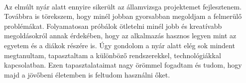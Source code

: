	\paragraph{}
	Az elmúlt nyár alatt ennyire sikerült az államvizsga projektemet fejlesztenem. Továbbra is törekszem, hogy minél jobban gyorsabban megoldjam a felmerülő problémákat. Folyamatosan próbálok ötletelni minél jobb és kreatívabb megoldásokról annak érdekében, hogy az alkalmazás hasznos legyen mint az egyetem és a diákok részére is. Úgy gondolom a nyár alatt elég sok mindent megtanultam, tapasztaltam a különböző rendszerekkel, technológiákkal kapcsolatban. Ezen tapasztalataimat nagy örömmel fogadtam és tudom, hogy majd a jövőbeni életemben is feltudom használni őket.